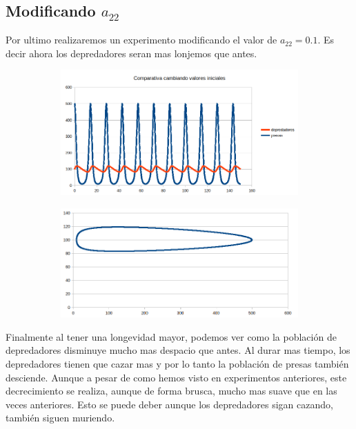 \documentclass[12pt,a4paper]{article}
\begin{document}
\subsection{Modificando $a_{22}$}
Por ultimo realizaremos un experimento modificando el valor de $a_{22}= 0.1$. Es decir ahora los depredadores seran mas lonjemos que antes.  
\begin{figure}[H]
	\centering
	\begin{subfigure}{.5\textwidth}
		\centering
	\includegraphics[width=1\linewidth]{images/ejercicio4_4_1}
		\caption{}
	\label{fig:ejercicio441}
	\end{subfigure}%
	\begin{subfigure}{.5\textwidth}
		\centering
	\includegraphics[width=1\linewidth]{images/ejercicio4_4_2}
		\caption{}
	\label{fig:ejercicio442}
	\end{subfigure}
	
	\label{fig:ejercicio44}
\end{figure}
Finalmente al tener una longevidad mayor, podemos ver como la población de depredadores disminuye mucho mas despacio que antes. Al durar mas tiempo, los depredadores tienen que cazar mas y por lo tanto la población de presas también desciende. Aunque a pesar de como hemos visto en experimentos anteriores, este decrecimiento se realiza, aunque de forma brusca, mucho mas suave que en las veces anteriores. Esto se puede deber aunque los depredadores sigan cazando, también siguen muriendo.
\end{document}
